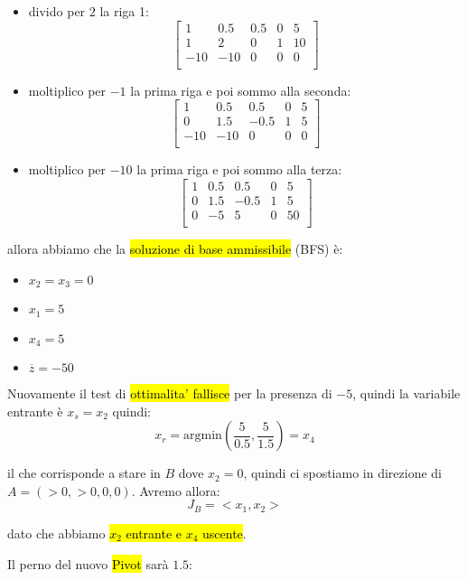 \begin{itemize}
	\item divido per $2$ la riga 1:
		$$
		\left[ {\begin{array}{ccccc}
			1 & 0.5 & 0.5 & 0 & 5\\
			1 & 2 & 0 & 1 & 10\\
			-10 & -10 & 0 & 0 & 0\\
		\end{array} } \right]
		$$

		\item moltiplico per $-1$ la prima riga e poi sommo alla seconda:
		$$
		\left[ {\begin{array}{ccccc}
			1 & 0.5 & 0.5 & 0 & 5\\
			0 & 1.5 & -0.5 & 1 & 5\\
			-10 & -10 & 0 & 0 & 0\\
		\end{array} } \right]
		$$

		\item moltiplico per $-10$ la prima riga e poi sommo alla terza:
		$$
		\left[ {\begin{array}{ccccc}
			1 & 0.5 & 0.5 & 0 & 5\\
			0 & 1.5 & -0.5 & 1 & 5\\
			0 & -5 & 5 & 0 & 50\\
		\end{array} } \right]
		$$
\end{itemize}

allora abbiamo che la \hl{soluzione di base ammissibile} (BFS) è:

\begin{itemize}
	\item $x_2 = x_3 = 0$
	\item $x_1 = 5$
	\item $x_4 = 5$
	\item $\overline{z} = -50$
\end{itemize}

Nuovamente il test di \hl{ottimalita' fallisce} per la presenza di $-5$, quindi la variabile entrante è $x_s = x_2$ quindi:
$$x_r = \text{argmin} (\frac{5}{0.5}, \frac{5}{1.5}) = x_4$$

il che corrisponde a stare in $B$ dove $x_2 = 0$, quindi ci spostiamo in direzione di $A = (> 0, > 0, 0, 0)$. Avremo allora:
$$J_B = <x_1, x_2>$$

dato che abbiamo \hl{$x_2$ entrante e $x_4$ uscente}.

Il perno del nuovo \hl{Pivot} sarà $1.5$:

